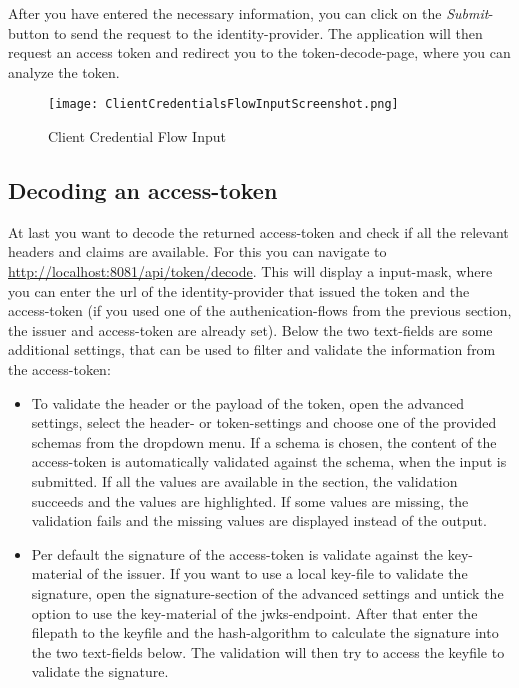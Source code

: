\documentclass[english, letterpaper, 10 pt]{report}
\begin{document}
\noindent After you have entered the necessary information, you can click on the \textit{Submit}-button to send the request to the identity-provider. The application will then request an access token and redirect you to the token-decode-page, where you can analyze the token.
\\
\begin{figure}[H]
\texttt{[image: ClientCredentialsFlowInputScreenshot.png]}
\caption{Client Credential Flow Input}
\end{figure}

\subsection*{Decoding an access-token} \label{Decode-Token}

\noindent At last you want to decode the returned access-token and check if all the relevant headers and claims are available. For this you can navigate to \url{http://localhost:8081/api/token/decode}. This will display a input-mask, where you can enter the url of the identity-provider that issued the token and the access-token (if you used one of the authenication-flows from the previous section, the issuer and access-token are already set). Below the two text-fields are some additional settings, that can be used to filter and validate the information from the access-token:
\begin{itemize}
\item To validate the header or the payload of the token, open the advanced settings, select the header- or token-settings and choose one of the provided schemas from the dropdown menu. If a schema is chosen, the content of the access-token is automatically validated against the schema, when the input is submitted. If all the values are available in the section, the validation succeeds and the values are highlighted. If some values are missing, the validation fails and the missing values are displayed instead of the output.
\item Per default the signature of the access-token is validate against the key-material of the issuer. If you want to use a local key-file to validate the signature, open the signature-section of the advanced settings and untick the option to use the key-material of the jwks-endpoint. After that enter the filepath to the keyfile and the hash-algorithm to calculate the signature into the two text-fields below. The validation will then try to access the keyfile to validate the signature.
\end{itemize}
\end{document}
